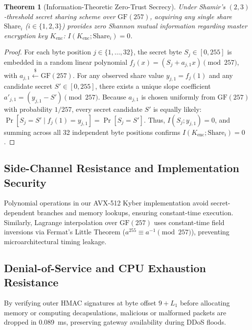 \documentclass[pdflatex,sn-mathphys,Numbered]{sn-jnl}%
\theoremstyle{thmstyleone}%
\newtheorem{theorem}{Theorem}%
\theoremstyle{thmstyletwo}%
\theoremstyle{thmstylethree}%
\begin{document}
\begin{theorem}[Information-Theoretic Zero-Trust Secrecy]
Under Shamir's $(2,3)$-threshold secret sharing scheme over $\text{GF}(257)$, acquiring any single share $\text{Share}_i$ ($i \in \{1, 2, 3\}$) provides zero Shannon mutual information regarding master encryption key $K_{\text{enc}}$: $I(K_{\text{enc}}; \text{Share}_i) = 0$.
\end{theorem}
\begin{proof}
For each byte position $j \in \{1, \dots, 32\}$, the secret byte $S_j \in [0, 255]$ is embedded in a random linear polynomial $f_j(x) = (S_j + a_{j,1} x) \pmod{257}$, with $a_{j,1} \xleftarrow{\$} \text{GF}(257)$. For any observed share value $y_{j,1} = f_j(1)$ and any candidate secret $S' \in [0, 255]$, there exists a unique slope coefficient $a'_{j,1} = (y_{j,1} - S') \pmod{257}$. Because $a_{j,1}$ is chosen uniformly from $\text{GF}(257)$ with probability $1/257$, every secret candidate $S'$ is equally likely: $\Pr[S_j = S' \mid f_j(1) = y_{j,1}] = \Pr[S_j = S']$. Thus, $I(S_j; y_{j,1}) = 0$, and summing across all 32 independent byte positions confirms $I(K_{\text{enc}}; \text{Share}_i) = 0$.
\end{proof}

\subsection{\textbf{Side-Channel Resistance and Implementation Security}}
Polynomial operations in our AVX-512 Kyber implementation avoid secret-dependent branches and memory lookups, ensuring constant-time execution. Similarly, Lagrange interpolation over $\text{GF}(257)$ uses constant-time field inversions via Fermat's Little Theorem ($a^{255} \equiv a^{-1} \pmod{257}$), preventing microarchitectural timing leakage.

\subsection{\textbf{Denial-of-Service and CPU Exhaustion Resistance}}
By verifying outer HMAC signatures at byte offset $9 + L_1$ before allocating memory or computing decapsulations, malicious or malformed packets are dropped in 0.089~ms, preserving gateway availability during DDoS floods.
\end{document}

